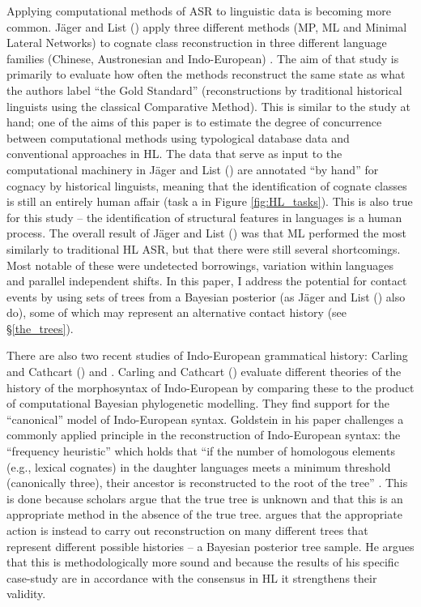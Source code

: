 \documentclass[12pt,letterpaper]{article}
\begin{document}
Applying computational methods of ASR to linguistic data is becoming more common. J\"ager and List (\citeyear{jager2018using}) apply three different methods (MP, ML and Minimal Lateral Networks) to cognate class reconstruction in three different language families (Chinese, Austronesian and Indo-European) . The aim of that study is primarily to evaluate how often the methods reconstruct the same state as what the authors label ``the Gold Standard'' (reconstructions by traditional historical linguists using the classical Comparative Method). This is similar to the study at hand; one of the aims of this paper is to estimate the degree of concurrence between computational methods using typological database data and conventional approaches in HL. The data that serve as input to the computational machinery in J\"ager and List (\citeyear{jager2018using}) are annotated ``by hand'' for cognacy by historical linguists, meaning that the identification of cognate classes is still an entirely human affair (task a in Figure \ref{fig:HL_tasks}). This is also true for this study -- the identification of structural features in languages is a human process. The overall result of J\"ager and List (\citeyear{jager2018using}) was that ML performed the most similarly to traditional HL ASR, but that there were still several shortcomings. Most notable of these were undetected borrowings, variation within languages and parallel independent shifts. In this paper, I address the potential for contact events by using sets of trees from a Bayesian posterior (as J\"ager and List (\citeyear{jager2018using}) also do), some of which may represent an alternative contact history (see §\ref{the_trees}).

There are also two recent studies of Indo-European grammatical history: Carling and Cathcart (\citeyear{carling2021reconstructing}) and \citet{goldstein_2022}. Carling and Cathcart (\citeyear{carling2021reconstructing}) evaluate different theories of the history of the morphosyntax of Indo-European by comparing these to the product of computational Bayesian phylogenetic modelling. They find support for the ``canonical'' model of Indo-European syntax. Goldstein in his paper challenges a commonly applied principle in the reconstruction of Indo-European syntax: the ``frequency heuristic'' which holds that ``if the number of homologous elements (e.g., lexical cognates) in the daughter languages meets a minimum threshold (canonically three), their ancestor is reconstructed to the root of the tree'' \citep[3]{goldstein_2022}. This is done because scholars argue that the true tree is unknown and that this is an appropriate method in the absence of the true tree. \citeauthor{goldstein_2022} argues that the appropriate action is instead to carry out reconstruction on many different trees that represent different possible histories -- a Bayesian posterior tree sample. He argues that this is methodologically more sound and because the results of his specific case-study are in accordance with the consensus in HL it strengthens their validity.
\end{document}
